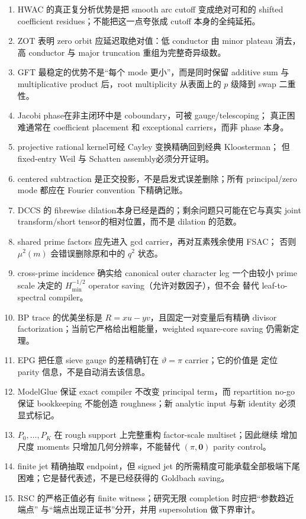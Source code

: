 \documentclass[11pt,a4paper]{ctexart}
\theoremstyle{definition}
\newcommand{\1}{\mathbf 1}
\begin{document}
\begin{enumerate}
\item HWAC 的真正复分析优势是把 smooth arc cutoff 变成绝对可和的 shifted
coefficient residues；不能把这一点夸张成 cutoff 本身的全纯延拓。
\item ZOT 表明 zero orbit 应延迟取绝对值：低 conductor 由 minor plateau
消去，高 conductor 与 major truncation 重组为完整奇异级数。
\item GFT 最稳定的优势不是“每个 mode 更小”，而是同时保留 additive sum 与
multiplicative product 后，root multiplicity 从表面上的 $p$ 级降到 swap 二重性。
\item Jacobi phase在非主闭环中是 coboundary，可被 gauge/telescoping；
真正困难通常在 coefficient placement 和 exceptional carriers，而非 phase 本身。
\item projective rational kernel可经 Cayley 变换精确回到经典 Kloosterman；
但 fixed-entry Weil 与 Schatten assembly必须分开证明。
\item centered subtraction 是正交投影，不是启发式误差删除；所有 principal/zero
mode 都应在 Fourier convention 下精确记账。
\item DCCS 的 fibrewise dilation本身已经是酉的；剩余问题只可能在它与真实
joint transform/short tensor的相对位置，而不是 dilation 的范数。
\item shared prime factors 应先进入 gcd carrier，再对互素残余使用 FSAC；
否则 $\mu^2(m)$ 会错误删除原和中的 $q^2$ 状态。
\item cross-prime incidence 确实给 canonical outer character leg 一个由较小
prime scale 决定的 $H_{\min}^{-1/2}$ operator saving（允许对数因子），但不会
替代 leaf-to-spectral compiler。
\item BP trace 的优美坐标是 $R=xu-yv$，且固定一对变量后有精确 divisor
factorization；当前它严格给出粗能量，weighted square-core saving 仍需新定理。
\item EPG 把任意 sieve gauge 的差精确钉在 $\vartheta=\pi$ carrier；它的价值是
定位 parity 信息，不是自动消去该信息。
\item ModelGlue 保证 exact compiler 不改变 principal term，而 repartition no-go
保证 bookkeeping 不能创造 roughness；新 analytic input 与新 identity 必须显式标记。
\item $P_0,\ldots,P_K$ 在 rough support 上完整重构 factor-scale multiset；因此继续
增加尺度 moments 只增加几何分辨率，不能替代 $(\pi,\mathbf0)$ parity control。
\item finite jet 精确抽取 endpoint，但 signed jet 的所需精度可能承载全部极端下尾
困难；它是替代表述，不是已经获得的 Goldbach saving。
\item RSC 的严格正值必有 finite witness；研究无限 completion 时应把“参数趋近端点”
与“端点出现正证书”分开，并用 supersolution 做下界审计。
\end{enumerate}
\end{document}
